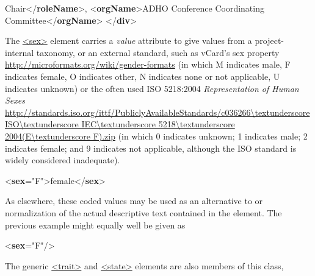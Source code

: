 \begin{shaded}
\hspace*{1em}\mbox{}\newline 
\hspace*{1em}Chair{</\textbf{roleName}>}, {<\textbf{orgName}>}ADHO Conference Coordinating Committee{</\textbf{orgName}>}\mbox{}\newline 
{}\mbox{}\newline 
{</\textbf{div}>}\end{shaded}\egroup\par \par
The \hyperref[TEI.sex]{<sex>} element carries a {\itshape value} attribute to give values from a project-internal taxonomy, or an external standard, such as vCard's sex property \url{http://microformats.org/wiki/gender-formats} (in which M indicates male, F indicates female, O indicates other, N indicates none or not applicable, U indicates unknown) or the often used ISO 5218:2004 \textit{Representation of Human Sexes} \url{http://standards.iso.org/ittf/PubliclyAvailableStandards/c036266\textunderscore ISO\textunderscore IEC\textunderscore 5218\textunderscore 2004(E\textunderscore F).zip} (in which 0 indicates unknown; 1 indicates male; 2 indicates female; and 9 indicates not applicable, although the ISO standard is widely considered inadequate). \par\bgroup{}\exampleFont \begin{shaded}\noindent\mbox{}{<\textbf{sex}\hspace*{1em}{value}="{F}">}female{</\textbf{sex}>}\end{shaded}\egroup\par \noindent  As elsewhere, these coded values may be used as an alternative to or normalization of the actual descriptive text contained in the element. The previous example might equally well be given as \par\bgroup{}\exampleFont \begin{shaded}\noindent\mbox{}{<\textbf{sex}\hspace*{1em}{value}="{F}"/>}\end{shaded}\egroup\par \par
The generic \hyperref[TEI.trait]{<trait>} and \hyperref[TEI.state]{<state>} elements are also members of this class, 
